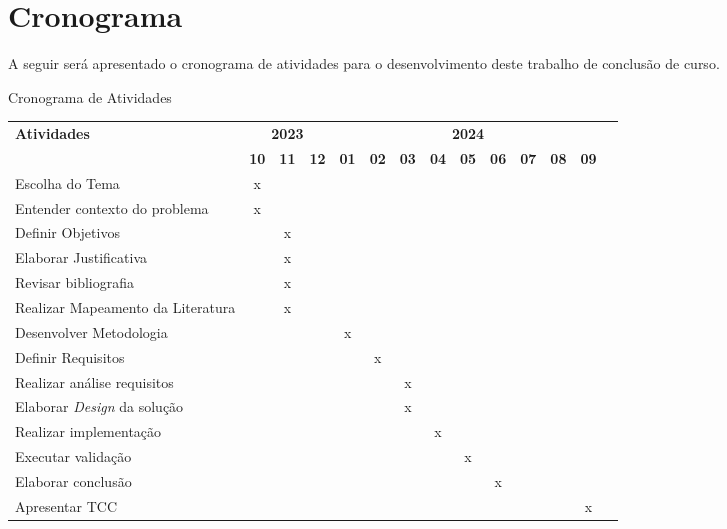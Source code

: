 

% 

% 







\textual









\chapter{Cronograma}
\label{cap:cronograma}
A seguir será apresentado o cronograma de atividades para o desenvolvimento deste trabalho de conclusão de curso.
\begin{quadro}[H]
    \centering
    \caption{Cronograma de Atividades}
    \begin{tabular}{|p{3.5cm}|c|c|c|c|c|c|c|c|c|c|c|c|c|}
        \hline
        \multirow{2}{*}{\textbf{Atividades}} & \multicolumn{3}{c|}{\textbf{2023}} & \multicolumn{9}{c|}{\textbf{2024}} \\ \cline{2-13}
        & \textbf{10} & \textbf{11} & \textbf{12} & \textbf{01} & \textbf{02} & \textbf{03} & \textbf{04} & \textbf{05} & \textbf{06} & \textbf{07} & \textbf{08}& \textbf{09} \\ \hline
        Escolha do Tema & x & & & & & & & & & & & \\ \hline
        Entender contexto do problema & x & & & & & & & & & & & \\ \hline
        Definir Objetivos & & x & & & & & & & & & & \\ \hline
        Elaborar Justificativa & & x & & & & & & & & & & \\ \hline
        Revisar bibliografia & & x & & & & & & & & & & \\ \hline
        Realizar Mapeamento da Literatura & & x & & & & & & & & & & \\ \hline
        Desenvolver Metodologia & & & & x & & & & & & & & \\ \hline
        Definir Requisitos & & & & & x & & & & & & & \\ \hline
        Realizar análise requisitos & & & & & & x & & & & & & \\ \hline
        Elaborar \textit{Design} da solução & & & & & & x & & & & & & \\ \hline
        Realizar implementação & & & & & & & x & & & & & \\ \hline
        Executar validação & & & & & & & & x & & & & \\ \hline
        Elaborar conclusão & & & & & & & & & x & & & \\ \hline
        Apresentar TCC & & & & & & & & & & & & x \\ \hline
      \end{tabular}
    \label{quad:cronograma}
\end{quadro}
